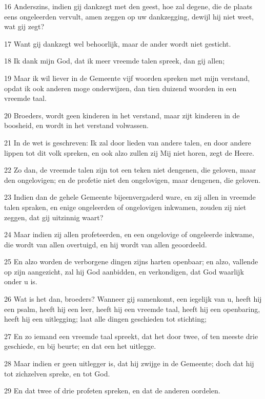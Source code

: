 \par 16 Anderszins, indien gij dankzegt met den geest, hoe zal degene, die de plaats eens ongeleerden vervult, amen zeggen op uw dankzegging, dewijl hij niet weet, wat gij zegt?
\par 17 Want gij dankzegt wel behoorlijk, maar de ander wordt niet gesticht.
\par 18 Ik dank mijn God, dat ik meer vreemde talen spreek, dan gij allen;
\par 19 Maar ik wil liever in de Gemeente vijf woorden spreken met mijn verstand, opdat ik ook anderen moge onderwijzen, dan tien duizend woorden in een vreemde taal.
\par 20 Broeders, wordt geen kinderen in het verstand, maar zijt kinderen in de boosheid, en wordt in het verstand volwassen.
\par 21 In de wet is geschreven: Ik zal door lieden van andere talen, en door andere lippen tot dit volk spreken, en ook alzo zullen zij Mij niet horen, zegt de Heere.
\par 22 Zo dan, de vreemde talen zijn tot een teken niet dengenen, die geloven, maar den ongelovigen; en de profetie niet den ongelovigen, maar dengenen, die geloven.
\par 23 Indien dan de gehele Gemeente bijeenvergaderd ware, en zij allen in vreemde talen spraken, en enige ongeleerden of ongelovigen inkwamen, zouden zij niet zeggen, dat gij uitzinnig waart?
\par 24 Maar indien zij allen profeteerden, en een ongelovige of ongeleerde inkwame, die wordt van allen overtuigd, en hij wordt van allen geoordeeld.
\par 25 En alzo worden de verborgene dingen zijns harten openbaar; en alzo, vallende op zijn aangezicht, zal hij God aanbidden, en verkondigen, dat God waarlijk onder u is.
\par 26 Wat is het dan, broeders? Wanneer gij samenkomt, een iegelijk van u, heeft hij een psalm, heeft hij een leer, heeft hij een vreemde taal, heeft hij een openbaring, heeft hij een uitlegging; laat alle dingen geschieden tot stichting;
\par 27 En zo iemand een vreemde taal spreekt, dat het door twee, of ten meeste drie geschiede, en bij beurte; en dat een het uitlegge.
\par 28 Maar indien er geen uitlegger is, dat hij zwijge in de Gemeente; doch dat hij tot zichzelven spreke, en tot God.
\par 29 En dat twee of drie profeten spreken, en dat de anderen oordelen.
